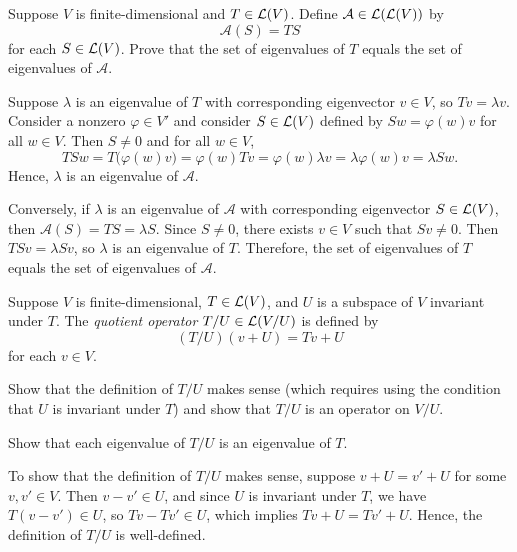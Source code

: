 \begin{exc}
\begin{exercise}
Suppose $V$ is finite-dimensional and $T\in\mathcal{L}(V)$. Define
$\mathcal{A}\in\mathcal{L}(\mathcal{L}(V))$ by
\[ \mathcal{A}(S) = TS \]
for each $S\in\mathcal{L}(V)$. Prove that the set of eigenvalues of $T$ equals the
set of eigenvalues of $\mathcal{A}$.
\end{exercise}
\begin{solution}
Suppose $\lambda$ is an eigenvalue of $T$ with corresponding eigenvector
$v\in V$, so $Tv=\lambda v$. Consider a nonzero $\varphi\in V'$ and consider
$S\in\mathcal{L}(V)$ defined by $Sw=\varphi(w)v$ for all $w\in V$. Then $S\ne0$ and
for all $w\in V$,
\[ TSw = T\bigl(\varphi(w)v\bigr) = \varphi(w)Tv = \varphi(w)\lambda v
   = \lambda\varphi(w)v = \lambda Sw. \]
Hence, $\lambda$ is an eigenvalue of $\mathcal{A}$.

Conversely, if $\lambda$ is an eigenvalue of $\mathcal{A}$ with corresponding
eigenvector $S\in\mathcal{L}(V)$, then $\mathcal{A}(S)=TS=\lambda S$. Since $S\ne0$,
there exists $v\in V$ such that $Sv\ne0$. Then $TSv=\lambda Sv$, so $\lambda$
is an eigenvalue of $T$. Therefore, the set of eigenvalues of $T$ equals the
set of eigenvalues of $\mathcal{A}$.
\end{solution}

\begin{exercise}
Suppose $V$ is finite-dimensional, $T\in\mathcal{L}(V)$, and $U$ is a subspace of $V$
invariant under $T$. The \emph{quotient operator} $T/U\in\mathcal{L}(V/U)$ is defined
by
\[ (T/U)(v+U) = Tv+U \]
for each $v\in V$.
\begin{parts}
\item Show that the definition of $T/U$ makes sense (which requires using the
  condition that $U$ is invariant under $T$) and show that $T/U$ is an
  operator on $V/U$.
\item Show that each eigenvalue of $T/U$ is an eigenvalue of $T$.
\end{parts}
\end{exercise}
\begin{solution}
\begin{parts}
\item To show that the definition of $T/U$ makes sense, suppose
  $v+U=v'+U$ for some $v,v'\in V$. Then $v-v'\in U$, and since $U$ is
  invariant under $T$, we have $T(v-v')\in U$, so $Tv-Tv'\in U$, which implies
  $Tv+U=Tv'+U$. Hence, the definition of $T/U$ is well-defined.


\end{parts}
\end{solution}
\end{exc}

